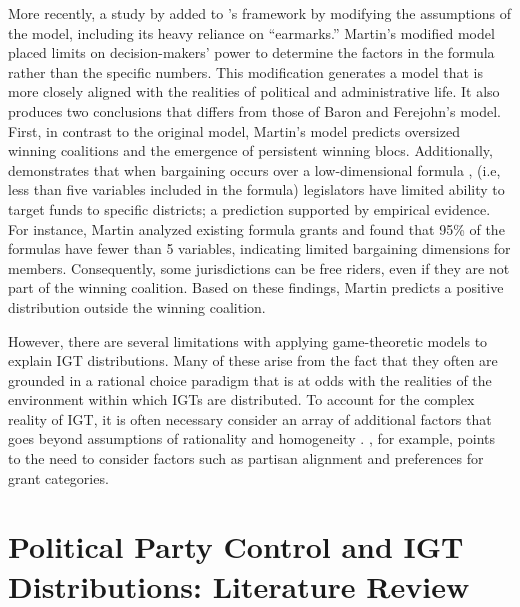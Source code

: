 More recently, a study by \textcite{martin2018dividing} added to \textcite{baron1989bargaining}'s framework by modifying the assumptions of the model, including its heavy reliance on “earmarks.” Martin's modified model placed limits on decision-makers' power to determine the factors in the formula rather than the specific numbers. This modification generates a model that is more closely aligned with the realities of political and administrative life. It also produces two conclusions that differs from those of Baron and Ferejohn's model. First, in contrast to the original model, Martin's model predicts oversized winning coalitions and the emergence of persistent winning blocs. Additionally, \textcite{martin2018dividing} demonstrates that when bargaining occurs over a low-dimensional formula  ,  (i.e, less than five variables included in the formula) legislators have limited ability to target funds to specific districts; a prediction supported by empirical evidence. For instance, Martin analyzed existing formula grants and found that 95\% of the formulas have fewer than 5 variables, indicating limited bargaining dimensions for members. Consequently, some jurisdictions can be free riders, even if they are not part of the winning coalition. Based on these findings, Martin predicts a positive distribution outside the winning coalition.

However, there are several limitations with applying game-theoretic models to explain IGT distributions. Many of these arise from the fact that they often are grounded in a rational choice paradigm that is at odds with the realities of the environment within which IGTs are distributed. To account for the complex reality of IGT, it is often necessary consider an array of additional factors that goes beyond assumptions of rationality and homogeneity \parencite{golden2008pork,milligan2005regional,petry1999electoral,tellier2006public}. \textcite{rosenstiel2021congressional}, for example, points to the need to consider factors such as partisan alignment and preferences for grant categories.

\section{Political Party Control and IGT Distributions: Literature Review }

